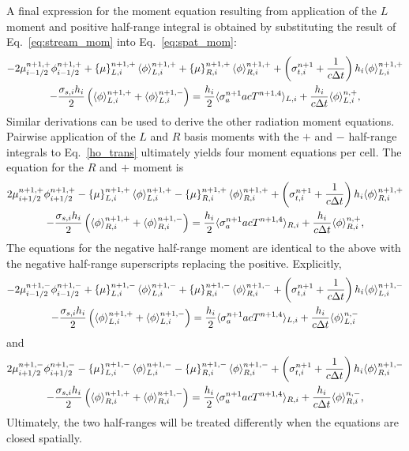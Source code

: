 A final expression for the moment equation resulting from application of the $L$ moment and
positive half-range integral is obtained by substituting the result of
Eq.~\eqref{eq:stream_mom} into Eq.~\eqref{eq:spat_mom}:
\begin{multline}\label{eq:exact_lmomp}
    -2{\mu}_{i-1/2}^{n+1,+} \phi_{i-1/2}^{n+1,+} + \left\{ \mu \right\}_{L,i}^{n+1,+}
  \langle \phi \rangle_{L,i}^{n+1,+}
  +  \left\{ \mu \right\}_{R,i}^{n+1,+}
  \langle \phi \rangle_{R,i}^{n+1,+} +  \left(\sigma_{t,i}^{n+1}+\frac{1}{c \Delta t} \right) h_i 
  \langle \phi \rangle_{L,i}^{n+1,+} \\-  \frac{\sigma_{s,i} h_i}{2} \left( \langle \phi \rangle_{L,i}^{n+1,+} +
  \langle \phi \rangle_{L,i}^{n+1,-}\right) = \frac{h_i}{2} \langle \sigma_a^{n+1} a c T^{n+1,4} \rangle_{L,i} +
  \frac{h_i}{c\Delta t}\langle \phi \rangle_{L,i}^{n,+},
\end{multline}
Similar derivations can be used to derive the other radiation moment equations.  
Pairwise application of the $L$ and $R$ basis
moments with the $+$ and $-$ half-range integrals to Eq.~\eqref{ho_trans} 
ultimately yields four moment
equations per cell.  The equation for the $R$ and $+$ moment is
\begin{multline}\label{eq:exact_rmomp}
    2{\mu}_{i+1/2}^{n+1,+} \phi_{i+1/2}^{n+1,+} - \left\{ \mu \right\}_{L,i}^{n+1,+}
  \langle \phi \rangle_{L,i}^{n+1,+}
  -  \left\{ \mu \right\}_{R,i}^{n+1,+}
  \langle \phi \rangle_{R,i}^{n+1,+} +  \left(\sigma_{t,i}^{n+1}+\frac{1}{c \Delta t} \right) h_i 
  \langle \phi \rangle_{R,i}^{n+1,+} \\-  \frac{\sigma_{s,i} h_i}{2} \left( \langle \phi \rangle_{R,i}^{n+1,+} +
  \langle \phi \rangle_{R,i}^{n+1,-}\right) = \frac{h_i}{2} \langle \sigma_a^{n+1} a c T^{n+1,4} \rangle_{R,i} +
  \frac{h_i}{c\Delta t}\langle \phi \rangle_{R,i}^{n,+},
\end{multline}
The equations for the negative half-range moment are identical to the above with the
negative half-range superscripts replacing the positive.  Explicitly,
\begin{multline}\label{eq:exact_lmomp}
    -2{\mu}_{i-1/2}^{n+1,-} \phi_{i-1/2}^{n+1,-} + \left\{ \mu \right\}_{L,i}^{n+1,-}
  \langle \phi \rangle_{L,i}^{n+1,-}
  +  \left\{ \mu \right\}_{R,i}^{n+1,-}
  \langle \phi \rangle_{R,i}^{n+1,-} +  \left(\sigma_{t,i}^{n+1}+\frac{1}{c \Delta t} \right) h_i 
  \langle \phi \rangle_{L,i}^{n+1,-} \\-  \frac{\sigma_{s,i} h_i}{2} \left( \langle \phi \rangle_{L,i}^{n+1,+} +
  \langle \phi \rangle_{L,i}^{n+1,-}\right) = \frac{h_i}{2} \langle \sigma_a^{n+1} a c T^{n+1,4} \rangle_{L,i} +
  \frac{h_i}{c\Delta t}\langle \phi \rangle_{L,i}^{n,-}
\end{multline}
and
\begin{multline}\label{eq:exact_rmomp}
    2{\mu}_{i+1/2}^{n+1,-} \phi_{i+1/2}^{n+1,-} - \left\{ \mu \right\}_{L,i}^{n+1,-}
  \langle \phi \rangle_{L,i}^{n+1,-}
  -  \left\{ \mu \right\}_{R,i}^{n+1,-}
  \langle \phi \rangle_{R,i}^{n+1,-} +  \left(\sigma_{t,i}^{n+1}+\frac{1}{c \Delta t} \right) h_i 
  \langle \phi \rangle_{R,i}^{n+1,-} \\-  \frac{\sigma_{s,i} h_i}{2} \left( \langle \phi \rangle_{R,i}^{n+1,+} +
  \langle \phi \rangle_{R,i}^{n+1,-}\right) = \frac{h_i}{2} \langle \sigma_a^{n+1} a c T^{n+1,4} \rangle_{R,i} +
  \frac{h_i}{c\Delta t}\langle \phi \rangle_{R,i}^{n,-},
\end{multline}
Ultimately, the two half-ranges will be treated differently when the equations are closed
spatially.

